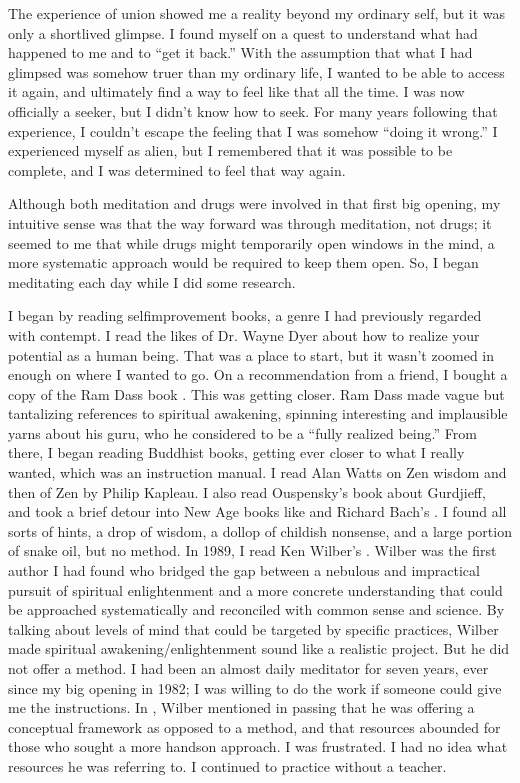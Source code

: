 \documentclass[a5paper,10pt,english]{book}
\begin{document}
\sphinxAtStartPar
The experience of union showed me a reality beyond my ordinary self, but
it was only a short\sphinxhyphen{}lived glimpse. I found myself on a quest to
understand what had happened to me and to “get it back.” With the
assumption that what I had glimpsed was somehow truer than my ordinary
life, I wanted to be able to access it again, and ultimately find a way
to feel like that all the time. I was now officially a seeker, but I
didn’t know how to seek. For many years following that experience, I
couldn’t escape the feeling that I was somehow “doing it wrong.” I
experienced myself as alien, but I remembered that it was possible to be
complete, and I was determined to feel that way again.

\sphinxAtStartPar
Although both meditation and drugs were involved in that first big
opening, my intuitive sense was that the way forward was through
meditation, not drugs; it seemed to me that while drugs might
temporarily open windows in the mind, a more systematic approach would
be required to keep them open. So, I began meditating each day while I
did some research.

\sphinxAtStartPar
I began by reading self\sphinxhyphen{}improvement books, a genre I had previously
regarded with contempt. I read the likes of Dr. Wayne Dyer about how to
realize your potential as a human being. That was a place to start, but
it wasn’t zoomed in enough on where I wanted to go. On a recommendation
from a friend, I bought a copy of the Ram Dass book . This
was getting closer. Ram Dass made vague but tantalizing references to
spiritual awakening, spinning interesting and implausible yarns about
his guru, who he considered to be a “fully realized being.” From there,
I began reading Buddhist books, getting ever closer to what I really
wanted, which was an instruction manual. I read Alan Watts on Zen wisdom
and then  of Zen by Philip Kapleau. I also read
Ouspensky’s book about Gurdjieff, and took a brief detour into New Age
books like  and Richard Bach’s . I found all
sorts of hints, a drop of wisdom, a dollop of childish nonsense, and a
large portion of snake oil, but no method. In 1989, I read Ken Wilber’s
. Wilber was the first author I had found who
bridged the gap between a nebulous and impractical pursuit of spiritual
enlightenment and a more concrete understanding that could be approached
systematically and reconciled with common sense and science. By talking
about levels of mind that could be targeted by specific practices,
Wilber made spiritual awakening/enlightenment sound like a realistic
project. But he did not offer a method. I had been an almost daily
meditator for seven years, ever since my big opening in 1982; I was
willing to do the work if someone could give me the instructions. In
, Wilber mentioned in passing that he was
offering a conceptual framework as opposed to a method, and that
resources abounded for those who sought a more hands\sphinxhyphen{}on approach. I was
frustrated. I had no idea what resources he was referring to. I
continued to practice without a teacher.
\end{document}
